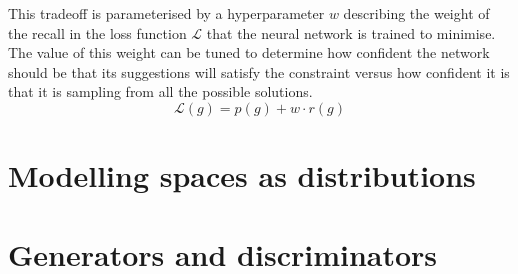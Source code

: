 \documentclass[../../main.tex]{subfiles}
\begin{document}
This tradeoff is parameterised by a hyperparameter $w$ describing the weight of the recall in the loss function $\mathcal{L}$ that the neural network is trained to minimise.
The value of this weight can be tuned to determine how confident the network should be that its suggestions will satisfy the constraint versus how confident it is that it is sampling from all the possible solutions.
$$\mathcal{L}(g) = p(g) + w \cdot r(g)$$

\section{Modelling spaces as distributions}

\section{Generators and discriminators}
\end{document}
